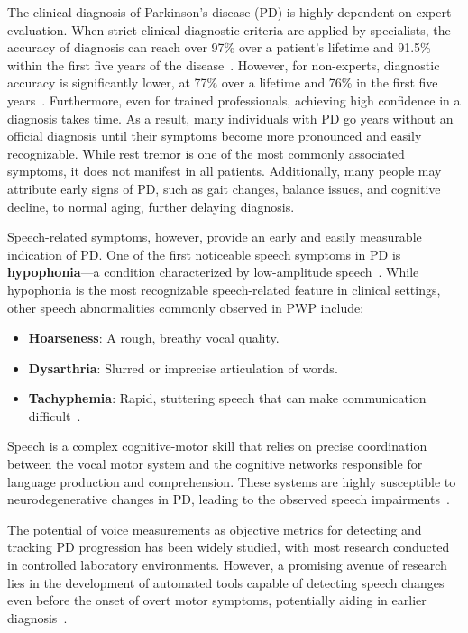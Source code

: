 \documentclass{paper}
\begin{document}
The clinical diagnosis of Parkinson’s disease (PD) is highly dependent on expert evaluation. When strict clinical diagnostic criteria are applied by specialists, the accuracy of diagnosis can reach over 97\% over a patient’s lifetime and 91.5\% within the first five years of the disease~\cite{virameteekul2023clinical}. However, for non-experts, diagnostic accuracy is significantly lower, at 77\% over a lifetime and 76\% in the first five years~\cite{virameteekul2023clinical}. Furthermore, even for trained professionals, achieving high confidence in a diagnosis takes time. As a result, many individuals with PD go years without an official diagnosis until their symptoms become more pronounced and easily recognizable. While rest tremor is one of the most commonly associated symptoms, it does not manifest in all patients. Additionally, many people may attribute early signs of PD, such as gait changes, balance issues, and cognitive decline, to normal aging, further delaying diagnosis.

Speech-related symptoms, however, provide an early and easily measurable indication of PD. One of the first noticeable speech symptoms in PD is \textbf{hypophonia}—a condition characterized by low-amplitude speech~\cite{ho1999speech}. While hypophonia is the most recognizable speech-related feature in clinical settings, other speech abnormalities commonly observed in PWP include:

\begin{itemize}
    \item \textbf{Hoarseness}: A rough, breathy vocal quality.
    \item \textbf{Dysarthria}: Slurred or imprecise articulation of words.
    \item \textbf{Tachyphemia}: Rapid, stuttering speech that can make communication difficult~\cite{logemann1978frequency, vercruysse2012freezing}.
\end{itemize}

Speech is a complex cognitive-motor skill that relies on precise coordination between the vocal motor system and the cognitive networks responsible for language production and comprehension. These systems are highly susceptible to neurodegenerative changes in PD, leading to the observed speech impairments~\cite{smith2018communication, rusz2013imprecise}. 

The potential of voice measurements as objective metrics for detecting and tracking PD progression has been widely studied, with most research conducted in controlled laboratory environments. However, a promising avenue of research lies in the development of automated tools capable of detecting speech changes even before the onset of overt motor symptoms, potentially aiding in earlier diagnosis~\cite{postuma2016voice}.
\end{document}
